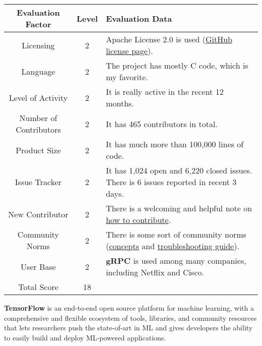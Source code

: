 \documentclass[11pt]{article}
\begin{document}
\begin{tabular}{|c|c|p{4in}|} 
\hline
Evaluation Factor & Level & Evaluation Data \\
\hline
Licensing & 2 & Apache License 2.0 is used (\href{https://github.com/grpc/grpc/blob/master/LICENSE}{GitHub license page}).\\
\hline
Language & 2 & The project has mostly C code, which is my favorite.\\
\hline
Level of Activity & 2 & It is really active in the recent 12 months.\\
\hline
Number of Contributors & 2 & It has 465 contributors in total.\\
\hline
Product Size & 2 & It has much more than 100,000 lines of code.\\
\hline
Issue Tracker & 2 & It has 1,024 open and 6,220 closed issues. There is 6 issues reported in recent 3 days.\\
\hline
New Contributor & 2 & There is a welcoming and helpful note on \href{https://github.com/grpc/grpc/blob/master/CONTRIBUTING.md}{how to contribute}.\\
\hline
Community Norms & 2 & There is some sort of community norms (\href{https://github.com/grpc/grpc/blob/master/CONCEPTS.md}{concepts} and \href{https://github.com/grpc/grpc/blob/master/TROUBLESHOOTING.md}{troubleshooting guide}).\\
\hline
User Base & 2 & \textbf{gRPC} is used among many companies, including Netflix and Cisco.\\
\hline
Total Score & 18 & \\
\hline
\end{tabular}

\textbf{TensorFlow} is an end-to-end open source platform for machine learning, with a comprehensive  and flexible ecosystem of tools, libraries, and community resources that lets researchers push the state-of-art in ML and gives developers the ability to easily build and deploy ML-powered applications.
\end{document}
